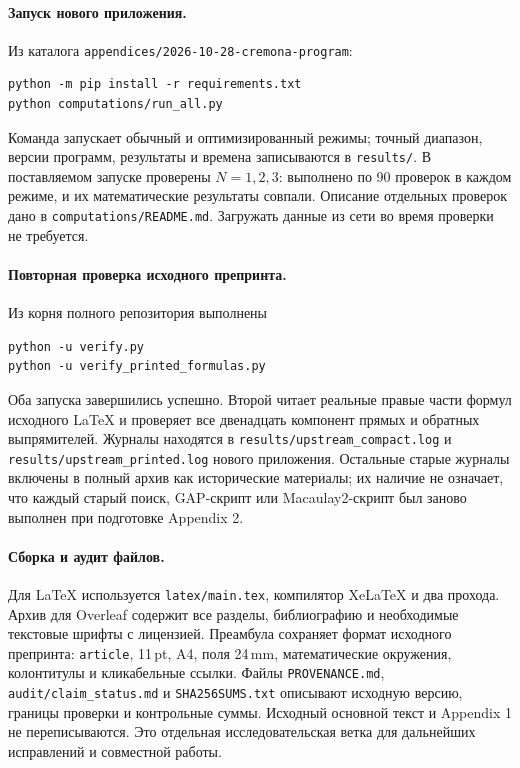 \paragraph{Запуск нового приложения.}
Из каталога \texttt{appendices/2026-10-28-cremona-program}:
\begin{verbatim}
python -m pip install -r requirements.txt
python computations/run_all.py
\end{verbatim}
Команда запускает обычный и оптимизированный режимы; точный диапазон,
версии программ, результаты и времена записываются в \texttt{results/}.
В поставляемом запуске проверены $N=1,2,3$: выполнено по 90 проверок
в каждом режиме, и их математические результаты совпали.
Описание отдельных проверок дано в \texttt{computations/README.md}.
Загружать данные из сети во время проверки не требуется.

\paragraph{Повторная проверка исходного препринта.}
Из корня полного репозитория выполнены
\begin{verbatim}
python -u verify.py
python -u verify_printed_formulas.py
\end{verbatim}
Оба запуска завершились успешно. Второй читает реальные правые части
формул исходного \LaTeX{} и проверяет все двенадцать компонент
прямых и обратных выпрямителей. Журналы находятся в
\texttt{results/upstream\_compact.log} и
\texttt{results/upstream\_printed.log} нового приложения.
Остальные старые журналы включены в полный архив как исторические
материалы; их наличие не означает, что каждый старый поиск, GAP-скрипт
или Macaulay2-скрипт был заново выполнен при подготовке Appendix 2.

\paragraph{Сборка и аудит файлов.}
Для \LaTeX{} используется \texttt{latex/main.tex}, компилятор XeLaTeX
и два прохода. Архив для Overleaf содержит все разделы, библиографию
и необходимые текстовые шрифты с лицензией. Преамбула сохраняет
формат исходного препринта: \texttt{article}, 11\,pt, A4, поля 24\,mm,
математические окружения, колонтитулы и кликабельные ссылки.
Файлы \texttt{PROVENANCE.md}, \texttt{audit/claim\_status.md} и
\texttt{SHA256SUMS.txt} описывают исходную версию, границы проверки
и контрольные суммы. Исходный основной текст и Appendix 1 не
переписываются. Это отдельная исследовательская ветка для дальнейших
исправлений и совместной работы.
